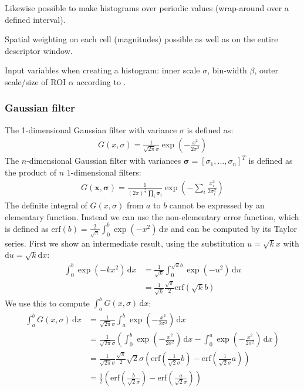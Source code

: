 \documentclass[../thesis.tex]{subfiles}
\begin{document}
Likewise possible to make histograms over periodic values (wrap-around over a defined interval).

Spatial weighting on each cell (magnitudes) possible as well as on the entire descriptor window.

Input variables when creating a histogram: inner scale $\sigma$, bin-width $\beta$, outer scale/size of ROI $\alpha$ according to \citet{koenderink1999structure}.
 

\subsubsection{Gaussian filter}

The 1-dimensional Gaussian filter with variance $\sigma$ is defined as:
%
\begin{align}
G(x,\sigma) = \frac{1}{\sqrt{2\pi} \sigma}
\exp\left( -\frac{x^2}{2 \sigma^2} \right)
\end{align}
%
The $n$-dimensional Gaussian filter with variances $\boldsymbol{\sigma} = [\sigma_1, ..., \sigma_n]^T$ is defined as the product of $n$ 1-dimensional filters:
%
\begin{align}
G(\mathbf{x},\boldsymbol{\sigma})
= \frac{1}{(2\pi)^\frac{n}{2} \prod_i \mathbf{\sigma}_i}
\exp\left( -\sum_i \frac{x_i^2}{2 \sigma_i^2} \right)
\end{align}
%
The definite integral of $G(x,\sigma)$ from $a$ to $b$ cannot be expressed by an elementary function. Instead we can use the non-elementary error function, which is defined as $\mathrm{erf}(b) = \frac{2}{\sqrt{\pi}} \int_0^b \exp(-x^2) \,\mathrm dx$ and can be computed by its Taylor series. First we show an intermediate result, using the substitution $u = \sqrt{k} x$ with $\mathrm du = \sqrt{k} \mathrm dx$:
%
\begin{align}
\int_0^b \exp(-k x^2) \,\mathrm dx
&= \frac{1}{\sqrt{k}} \int_0^{\sqrt{k}b} \exp(-u^2) \,\mathrm du \\
&= \frac{1}{\sqrt{k}} \frac{\sqrt{\pi}}{2} \mathrm{erf} \left( \sqrt{k} b \right)
\end{align}
%
We use this to compute $\int_a^b G(x,\sigma) \,\mathrm dx$:
%
\begin{align}
\int_a^b G(x,\sigma) \,\mathrm dx
&= \frac{1}{\sqrt{2\pi} \sigma} \int_a^b \exp\left( -\frac{x^2}{2 \sigma^2} \right) \,\mathrm dx \\
&= \frac{1}{\sqrt{2\pi} \sigma} \left( \int_0^b \exp\left( -\frac{x^2}{2 \sigma^2} \right) \,\mathrm dx - \int_0^a \exp\left( -\frac{x^2}{2 \sigma^2} \right) \,\mathrm dx \right) \\
&= \frac{1}{\sqrt{2\pi} \sigma} \frac{\sqrt{\pi}}{2} \sqrt{2} \sigma \left(
\mathrm{erf} \left( \frac{1}{\sqrt{2} \sigma} b \right) -
\mathrm{erf} \left( \frac{1}{\sqrt{2} \sigma} a \right) \right) \\
&= \frac{1}{2} \left(
\mathrm{erf} \left( \frac{b}{\sqrt{2} \sigma} \right) -
\mathrm{erf} \left( \frac{a}{\sqrt{2} \sigma} \right)
\right)
\end{align}
\end{document}
